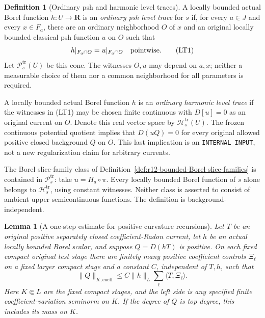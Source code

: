 \documentclass[11pt,a4paper]{article}
\numberwithin{equation}{section}
\newtheorem{lemma}[theorem]{Lemma}
\theoremstyle{definition}
\newtheorem{definition}[theorem]{Definition}
\theoremstyle{remark}
\begin{document}
\begin{definition}[Ordinary psh and harmonic level traces]
\label{def:r12-ordinary-level-traces}
A locally bounded actual Borel function $h:U\to\mathbf R$ is an
\emph{ordinary psh level trace} for $s$ if, for every $a\in J$ and
every $x\in F_a$, there are an ordinary neighborhood $O$ of $x$ and
an original locally bounded classical psh function $u$ on $O$ such
that
\[
                            h|_{F_a\cap O}=u|_{F_a\cap O}
                            \quad\hbox{pointwise}.                 \tag{LT1}
\]
Let $\mathcal P_s^{\mathrm{tr}}(U)$ be this cone. The witnesses
$O,u$ may depend on $a,x$; neither a measurable choice of them nor
a common neighborhood for all parameters is required.

A locally bounded actual Borel function $h$ is an \emph{ordinary
harmonic level trace} if the witnesses in (LT1) may be chosen
finite continuous with $D[u]=0$ as an original current on $O$.
Denote this real vector space by $\mathcal H_s^{\mathrm{tr}}(U)$.
The frozen continuous potential quotient implies that $D(uQ)=0$
for every original allowed positive closed background $Q$ on $O$.
This last implication is an \texttt{INTERNAL\_INPUT}, not a new
regularization claim for arbitrary currents.
\end{definition}

The Borel slice-family class of
Definition~\ref{def:r12-bounded-Borel-slice-families} is contained in
$\mathcal P_s^{\mathrm{tr}}$: take $u=H_a\circ\pi$. Every locally
bounded Borel function of $s$ alone belongs to
$\mathcal H_s^{\mathrm{tr}}$, using constant witnesses. Neither
class is asserted to consist of ambient upper semicontinuous
functions. The definition is background-independent.

\begin{lemma}[A one-step estimate for positive curvature recursions]
\label{lem:r12-positive-recursion-one-step-control}
Let $T$ be an original positive separately closed coefficient-Radon
current, let $h$ be an actual locally bounded Borel scalar, and
suppose $Q=D(hT)$ is positive. On each fixed compact original test
stage there are finitely many positive coefficient controls
$\Xi_\ell$ on a fixed larger compact stage and a constant $C$,
independent of $T,h$, such that
\[
             \|Q\|_{K,\mathrm{coeff}}
               \le C\|h\|_{L}\sum_\ell\langle T,\Xi_\ell\rangle.
                                                                    \tag{LT2}
\]
Here $K\Subset L$ are the fixed compact stages, and the left side
is any specified finite coefficient-variation seminorm on $K$.
If the degree of $Q$ is top degree, this includes its mass on $K$.
\end{lemma}
\end{document}
